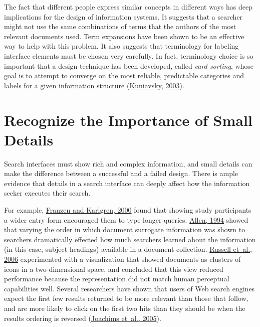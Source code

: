 \documentclass[sigconf,nonacm,screen,pbalance]{acmart}
\begin{document}
The fact that different people express similar concepts in different ways has deep implications for the
design of information systems. It suggests that a searcher might not use the same combinations of terms
that the authors of the most relevant documents used. Term expansions have been shown to be an effective
way to help with this problem. It also suggests that terminology for labeling interface elements must be
chosen very carefully. In fact, terminology choice is so important that a design technique has been
developed, called {\em  card sorting}, whose goal is to attempt to converge on the most reliable,
predictable categories and labels for a given information structure (\href{https://searchuserinterfaces.com/book/sui_references.html#kuniavsky2003oue}{Kuniavsky, 2003}).

\section{Recognize the Importance of Small Details}

Search interfaces must show rich and complex information, and small details can make the difference
between a successful and a failed design. There is ample evidence that details in a search interface can
deeply affect how the information seeker executes their search.

For example, \href{https://searchuserinterfaces.com/book/sui_references.html#franzen2000vai}{Franzen and Karlgren, 2000} found that showing study participants a
wider entry form encouraged them to type longer queries. \href{https://searchuserinterfaces.com/book/sui_references.html#allen1994psl}{Allen, 1994} showed that varying the order in which document surrogate information was shown to
searchers dramatically effected how much searchers learned about the information (in this case, subject
headings) available in a document collection. \href{https://searchuserinterfaces.com/book/sui_references.html#russell:bll}{Russell et~al., 2006} experimented with a visualization that
showed documents as clusters of icons in a two-dimensional space, and concluded that this view reduced
performance because the representation did not match human perceptual capabilities well. Several
researchers have shown that users of Web search engines expect the first few results returned to be more
relevant than those that follow, and are more likely to click on the first two hits than they should be
when the results ordering is reversed (\href{https://searchuserinterfaces.com/book/sui_references.html#joachims2005aic}{Joachims et~al., 2005}).
\end{document}
